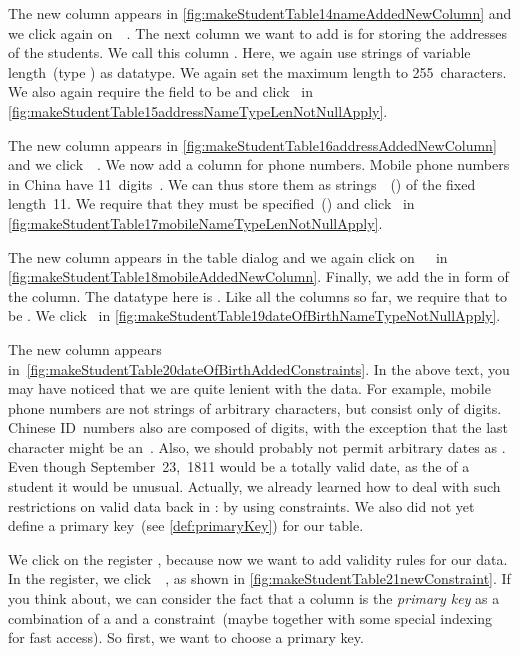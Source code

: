 The new column appears in \cref{fig:makeStudentTable14nameAddedNewColumn} and we click again on~~\pgmodelerAddItem.
The next column we want to add is for storing the addresses of the students.
We call this column .
Here, we again use strings of variable length~(type ) as datatype.
We again set the maximum length to 255~characters.
We also again require the field to be  and click~ in \cref{fig:makeStudentTable15addressNameTypeLenNotNullApply}.

The new column appears in \cref{fig:makeStudentTable16addressAddedNewColumn} and we click~~\pgmodelerAddItem.
We now add a column for  phone numbers.
Mobile phone numbers in China have 11~digits~\cite{BD2006BDBK:MPNANSBTTMDFMP}.
We can thus store them as strings~~() of the fixed length~11.
We require that they must be specified~() and click~ in \cref{fig:makeStudentTable17mobileNameTypeLenNotNullApply}.

The new column appears in the table dialog and we again click on~~\pgmodelerAddItem\ in \cref{fig:makeStudentTable18mobileAddedNewColumn}.
Finally, we add the  in form of the  column.
The datatype here is .
Like all the columns so far, we require that  to be .
We click~ in \cref{fig:makeStudentTable19dateOfBirthNameTypeNotNullApply}.

The new column appears in~\cref{fig:makeStudentTable20dateOfBirthAddedConstraints}.
In the above text, you may have noticed that we are quite lenient with the data.
For example, mobile phone numbers are not strings of arbitrary characters, but consist only of digits.
Chinese ID~numbers also are composed of digits, with the exception that the last character might be an~.
Also, we should probably not permit arbitrary dates as .
Even though September~23,~1811 would be a totally valid date, as the  of a student it would be unusual.
Actually, we already learned how to deal with such restrictions on valid data back in :
by using constraints.
We also did not yet define a primary key~(see \cref{def:primaryKey}) for our table.

We click on the register , because now we want to add validity rules for our data.
In the  register, we click~~\pgmodelerAddItem, as shown in \cref{fig:makeStudentTable21newConstraint}.
If you think about, we can consider the fact that a column is the \emph{primary key} as a combination of a  and a  constraint~(maybe together with some special indexing for fast access).
So first, we want to choose a primary key.

